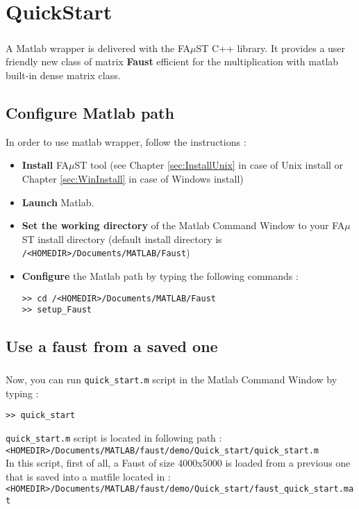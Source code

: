 \chapter{QuickStart}\label{sec:firstUse}


\paragraph{}A Matlab wrapper is delivered with the FA$\mu$ST C++ library.
It provides a user friendly new class of matrix \textbf{Faust} efficient for the multiplication with matlab built-in dense matrix class.\newline

\section{Configure Matlab path}\label{sec:firstUseMatlabPath}
In order to use matlab wrapper, follow the instructions :
\begin{itemize}
\item \textbf{Install} FA$\mu$ST tool (see Chapter \ref{sec:InstallUnix} in case of Unix install or Chapter \ref{sec:WinInstall} in case of Windows install)
\item \textbf{Launch} Matlab.
\item \textbf{Set the working directory} of the Matlab Command Window to your FA$\mu$ST install directory (default install directory is \texttt{/<HOMEDIR>/Documents/MATLAB/Faust})
\item \textbf{Configure} the Matlab path by typing the following commands :
\begin{lstlisting}
>> cd /<HOMEDIR>/Documents/MATLAB/Faust
>> setup_Faust
\end{lstlisting}

\end{itemize}

\section{Use a faust from a saved one}\label{sec:firstUseBuildFromSave}
\paragraph{} Now, you can run \texttt{quick\_start.m} script in the Matlab Command Window by typing :
\begin{lstlisting}
>> quick_start
\end{lstlisting}
\texttt{quick\_start.m} script is located in following path :\\
\texttt{<HOMEDIR>/Documents/MATLAB/faust/demo/Quick\_start/quick\_start.m} \\
In this script, first of all, a Faust of size 4000x5000 is loaded from a previous one that is saved into a matfile located in :\\
\texttt{<HOMEDIR>/Documents/MATLAB/faust/demo/Quick\_start/faust\_quick\_start.mat}

\newpage
